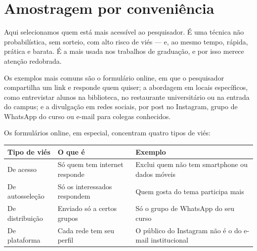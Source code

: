 \documentclass[
]{book}
\newcounter{none} %
\begin{document}
\section{Amostragem por conveniência}\label{amostragem-por-conveniuxeancia}

Aqui selecionamos quem está mais acessível ao pesquisador. É uma técnica não probabilística, sem sorteio, com alto risco de viés --- e, ao mesmo tempo, rápida, prática e barata. É a mais usada nos trabalhos de graduação, e por isso merece atenção redobrada.

Os exemplos mais comuns são o formulário online, em que o pesquisador compartilha um link e responde quem quiser; a abordagem em locais específicos, como entrevistar alunos na biblioteca, no restaurante universitário ou na entrada do campus; e a divulgação em redes sociais, por post no Instagram, grupo de WhatsApp do curso ou e-mail para colegas conhecidos.

Os formulários online, em especial, concentram quatro tipos de viés:

{\def\LTcaptype{none} %
\begin{longtable}[]{@{}
  >{\raggedright\arraybackslash}p{}
  >{\raggedright\arraybackslash}p{}
  >{\raggedright\arraybackslash}p{}@{}}
\toprule\noalign{}
\begin{minipage}[b]{\linewidth}\raggedright
Tipo de viés
\end{minipage} & \begin{minipage}[b]{\linewidth}\raggedright
O que é
\end{minipage} & \begin{minipage}[b]{\linewidth}\raggedright
Exemplo
\end{minipage} \\
\midrule\noalign{}
\endhead
\bottomrule\noalign{}
\endlastfoot
De acesso & Só quem tem internet responde & Exclui quem não tem smartphone ou dados móveis \\
De autosseleção & Só os interessados respondem & Quem gosta do tema participa mais \\
De distribuição & Enviado só a certos grupos & Só o grupo de WhatsApp do seu curso \\
De plataforma & Cada rede tem seu perfil & O público do Instagram não é o do e-mail institucional \\
\end{longtable}
}
\end{document}

